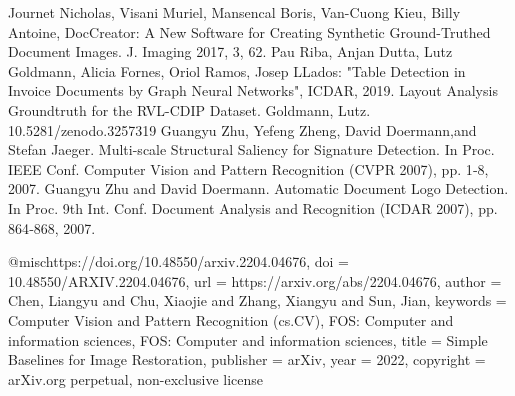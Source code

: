 \documentclass[runningheads]{llncs}
\begin{document}
\begin{thebibliography}{8}
  {Journet Nicholas, Visani Muriel, Mansencal Boris, Van-Cuong Kieu, Billy Antoine, DocCreator: A New Software for Creating Synthetic Ground-Truthed Document Images. J. Imaging 2017, 3, 62.}
  {Pau Riba, Anjan Dutta, Lutz Goldmann, Alicia Fornes, Oriol Ramos, Josep LLados: "Table Detection in Invoice Documents by Graph Neural Networks", ICDAR, 2019.}
  {Layout Analysis Groundtruth for the RVL-CDIP Dataset. Goldmann, Lutz. 10.5281/zenodo.3257319}
  {Guangyu Zhu, Yefeng Zheng, David Doermann,and Stefan Jaeger. Multi-scale Structural Saliency for Signature Detection. In Proc. IEEE Conf. Computer Vision and Pattern Recognition (CVPR 2007), pp. 1‐8, 2007.}
  {Guangyu Zhu and David Doermann. Automatic Document Logo Detection. In Proc. 9th Int. Conf. Document Analysis and Recognition (ICDAR 2007), pp. 864‐868, 2007.}

  @misc{https://doi.org/10.48550/arxiv.2204.04676,
  doi = {10.48550/ARXIV.2204.04676},
  url = {https://arxiv.org/abs/2204.04676},
  author = {Chen, Liangyu and Chu, Xiaojie and Zhang, Xiangyu and Sun, Jian},
  keywords = {Computer Vision and Pattern Recognition (cs.CV), FOS: Computer and information sciences, FOS: Computer and information sciences},
  title = {Simple Baselines for Image Restoration},
  publisher = {arXiv},
  year = {2022},
  copyright = {arXiv.org perpetual, non-exclusive license}
}


\end{thebibliography}
\end{document}
